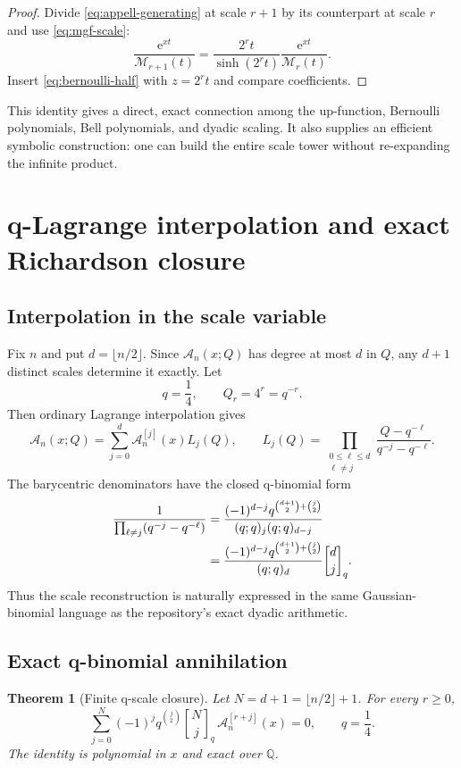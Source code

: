 \documentclass[11pt,oneside]{article}
\newtheorem{theorem}{Theorem}[section]
\theoremstyle{definition}
\theoremstyle{remark}
\newcommand{\Q}{\mathbb Q}
\newcommand{\e}{\mathrm e}
\newcommand{\qbinom}[3]{\genfrac{[}{]}{0pt}{}{#1}{#2}_{#3}}
\newcommand{\Acard}{\mathcal A}
\newcommand{\M}{\mathcal M}
\begin{document}
\begin{proof}
Divide \eqref{eq:appell-generating} at scale $r+1$ by its counterpart at scale $r$ and use \eqref{eq:mgf-scale}:
\[
 \frac{\e^{xt}}{\M_{r+1}(t)}
 =\frac{2^rt}{\sinh(2^rt)}\frac{\e^{xt}}{\M_r(t)}.
\]
Insert \eqref{eq:bernoulli-half} with $z=2^rt$ and compare coefficients.
\end{proof}

This identity gives a direct, exact connection among the up-function, Bernoulli polynomials, Bell polynomials, and dyadic scaling.  It also supplies an efficient symbolic construction: one can build the entire scale tower without re-expanding the infinite product.

\section{q-Lagrange interpolation and exact Richardson closure}
\label{sec:qscale}

\subsection{Interpolation in the scale variable}
Fix $n$ and put $d=\lfloor n/2\rfloor$.  Since $\Acard_n(x;Q)$ has degree at most $d$ in $Q$, any $d+1$ distinct scales determine it exactly.  Let
\begin{equation}
 q=\frac14,
 \qquad Q_r=4^r=q^{-r}.
 \label{eq:qscale-nodes}
\end{equation}
Then ordinary Lagrange interpolation gives
\begin{equation}
 \Acard_n(x;Q)
 =\sum_{j=0}^{d}\Acard_n^{[j]}(x)L_j(Q),
 \qquad
 L_j(Q)=\prod_{\substack{0\le\ell\le d\\\ell\ne j}}
 \frac{Q-q^{-\ell}}{q^{-j}-q^{-\ell}}.
 \label{eq:scale-lagrange}
\end{equation}
The barycentric denominators have the closed q-binomial form
\begin{align}
 \frac1{\prod_{\ell\ne j}(q^{-j}-q^{-\ell})}
 &=\frac{(-1)^{d-j}q^{\binom{d+1}{2}+\binom j2}}
 {(q;q)_j(q;q)_{d-j}}
 \label{eq:barycentric-q}\\
 &=\frac{(-1)^{d-j}q^{\binom{d+1}{2}+\binom j2}}
 {(q;q)_d}\qbinom{d}{j}{q}.
 \notag
\end{align}
Thus the scale reconstruction is naturally expressed in the same Gaussian-binomial language as the repository's exact dyadic arithmetic.

\subsection{Exact q-binomial annihilation}
\begin{theorem}[Finite q-scale closure]
\label{thm:q-closure}
Let $N=d+1=\lfloor n/2\rfloor+1$.  For every $r\ge0$,
\begin{equation}
 \boxed{\quad
 \sum_{j=0}^{N}(-1)^jq^{\binom j2}
 \qbinom{N}{j}{q}\,
 \Acard_n^{[r+j]}(x)=0,
 \qquad q=\frac14.
 \quad}
 \label{eq:q-closure}
\end{equation}
The identity is polynomial in $x$ and exact over $\Q$.
\end{theorem}
\end{document}
